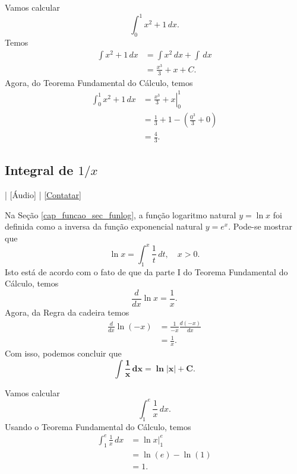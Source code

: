 \begin{ex}
  Vamos calcular
  \begin{equation}
    \int_{0}^1 x^2 + 1\,dx.
  \end{equation}
  Temos
  \begin{align}
    \int x^2 + 1\,dx &= \int x^2\,dx + \int \,dx\\
                     &= \frac{x^3}{3} + x + C.
  \end{align}
  Agora, do Teorema Fundamental do Cálculo, temos
  \begin{align}
    \int_0^1 x^2+1\,dx &= \left. \frac{x^3}{3} + x\right|_0^1 \\
                       &= \frac{1}{3} + 1 - \left(\frac{0^3}{3} + 0\right) \\
                       &= \frac{4}{3}.
  \end{align}
\end{ex}

\subsection{Integral de $1/x$}

\begin{flushright}
  [Vídeo] | [Áudio] | \href{https://phkonzen.github.io/notas/contato.html}{[Contatar]}
\end{flushright}

Na Seção \ref{cap_funcao_sec_funlog}, a função logaritmo natural $y = \ln x$ foi definida como a inversa da função exponencial natural $y = e^x$. Pode-se mostrar que
\begin{equation}
  \ln x = \int_1^x\frac{1}{t}\,dt,\quad x>0.
\end{equation}
Isto está de acordo com o fato de que da parte I do Teorema Fundamental do Cálculo, temos
\begin{equation}
  \frac{d}{dx}\ln x = \frac{1}{x}.
\end{equation}
Agora, da Regra da cadeira temos
\begin{align}
  \frac{d}{dx}\ln(-x) &= \frac{1}{-x}\frac{d(-x)}{dx} \\
                      &= \frac{1}{x}.
\end{align}
Com isso, podemos concluir que
\begin{equation}
  \pmb{\int \frac{1}{x}\,dx = \ln|x| + C}.
\end{equation}

\begin{ex}
  Vamos calcular
  \begin{equation}
    \int_1^e \frac{1}{x}\,dx.
  \end{equation}
  Usando o Teorema Fundamental do Cálculo, temos
  \begin{align}
    \int_1^e \frac{1}{x}\,dx &= \left. \ln x\right|_1^e \\
                             &= \ln(e) - \ln(1) \\
                             &= 1.
  \end{align}
\end{ex}

